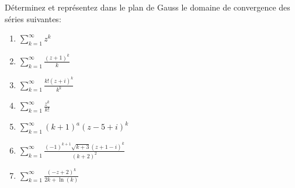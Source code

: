 
\begin{exercice}\label{exo0067}

Déterminez et représentez dans le plan de Gauss le domaine de convergence des séries suivantes:
\begin{multicols}{2}
\begin{enumerate}
\item $ \sum_{k = 1}^{\infty} z^k $
\item $ \sum_{k = 1}^{\infty} \frac{(z+1)^k}{k} $
\item $ \sum_{k = 1}^{\infty} \frac{k!(z+i)^k}{k^k} $
\item $ \sum_{k = 1}^{\infty} \frac{z^k}{k!} $
\item $ \sum_{k = 1}^{\infty} (k+1)^a (z-5+i)^k $
\item $ \sum_{k = 1}^{\infty} \frac{(-1)^{k+1} \sqrt{k+3} (z+1-i)^k }{(k+2)^2} $
\item $ \sum_{k = 1}^{\infty} \frac{(-z+2)^k}{2k +\ln(k)} $
\end{enumerate}
\end{multicols}

\end{exercice}
